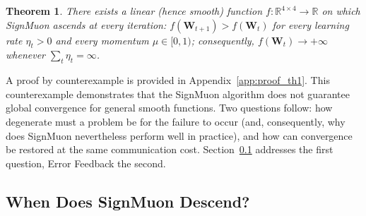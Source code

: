 \documentclass{article}
\newtheorem{theorem}{Theorem}
\begin{document}
\begin{theorem}\label{th:1} There exists a linear (hence smooth) function $f:\mathbb{R}^{4\times4}\to\mathbb{R}$ on which SignMuon ascends at every iteration: $f(\mathbf{W}_{t+1}) > f(\mathbf{W}_t)$ for every learning rate $\eta_t > 0$ and every momentum $\mu \in [0,1)$; consequently, $f(\mathbf{W}_t) \to +\infty$ whenever $\sum_t \eta_t = \infty$.
\end{theorem}
A proof by counterexample is provided in Appendix~\ref{app:proof_th1}.
This counterexample demonstrates that the SignMuon algorithm does not guarantee global convergence for general smooth functions. Two questions follow: how degenerate must a problem be for the failure to occur (and, consequently, why does SignMuon nevertheless perform well in practice), and how can convergence be restored at the same communication cost. Section~\ref{sec:descent} addresses the first question, Error Feedback the second.

\subsection{When Does SignMuon Descend?}\label{sec:descent}
\end{document}

